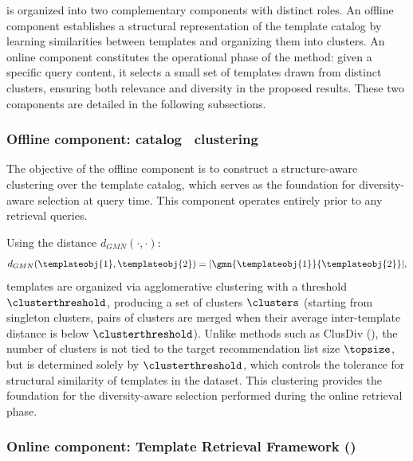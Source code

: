 \trs is organized into two complementary components with distinct roles.
An offline component establishes a structural representation of the template catalog by learning similarities between templates and organizing them into clusters.
An online component constitutes the operational phase of the method: given a specific query content, it selects a small set of templates drawn from distinct clusters, ensuring both relevance and diversity in the proposed results. These two components are detailed in the following subsections.

\subsubsection{Offline component: catalog \templatecatalog\ clustering}

The objective of the offline component is to construct a structure-aware clustering over the template catalog, which serves as the foundation for diversity-aware selection at query time. This component operates entirely prior to any retrieval queries.

 Using the distance $d_{GMN}(\cdot,\cdot)$:
\begin{equation}
d_{GMN}(\templateobj{1},\templateobj{2}) = |\gmn{\templateobj{1}}{\templateobj{2}}|,
\label{eq:gmn-distance-definition}
\end{equation}
templates are organized via agglomerative clustering with a threshold $\clusterthreshold$, producing a set of clusters $\clusters$ (starting from singleton clusters, pairs of clusters are merged when their average inter-template distance is below $\clusterthreshold$).  Unlike methods such as ClusDiv (), the number of clusters is not tied to the target recommendation list size $\topsize$, but is determined solely by $\clusterthreshold$, which controls the tolerance for structural similarity of templates in the dataset. This clustering provides the foundation for the diversity-aware selection performed during the online retrieval phase.

\subsubsection{Online component: Template Retrieval Framework (\trf)}

